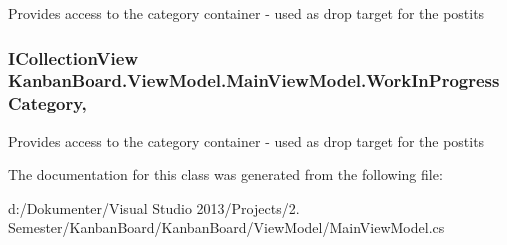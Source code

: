 Provides access to the category container -\/ used as drop target for the postits 

\hypertarget{class_kanban_board_1_1_view_model_1_1_main_view_model_abab8ec3a18854b226218782bcbee971b}{}
\subsubsection[{Work\+In\+Progress\+Category}]{\setlength{\rightskip}{0pt plus 5cm}I\+Collection\+View Kanban\+Board.\+View\+Model.\+Main\+View\+Model.\+Work\+In\+Progress\+Category\hspace{0.3cm}{\ttfamily [get]}, {\ttfamily [set]}}\label{class_kanban_board_1_1_view_model_1_1_main_view_model_abab8ec3a18854b226218782bcbee971b}


Provides access to the category container -\/ used as drop target for the postits 



The documentation for this class was generated from the following file\+:\begin{DoxyCompactItemize}
\item 
d\+:/\+Dokumenter/\+Visual Studio 2013/\+Projects/2. Semester/\+Kanban\+Board/\+Kanban\+Board/\+View\+Model/Main\+View\+Model.\+cs\end{DoxyCompactItemize}
